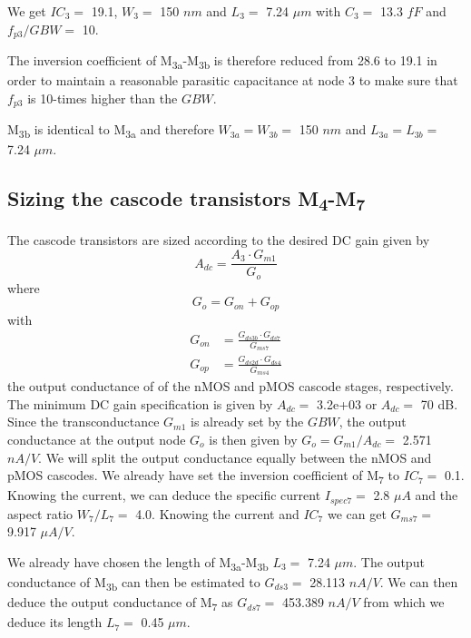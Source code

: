 \documentclass[
  a4paper,
  DIV=11,
  numbers=noendperiod]{scrreprt}
\begin{document}
We get \(IC_3 =\) 19.1, \(W_3 =\) 150 \(nm\) and \(L_3 =\) 7.24
\(\mu m\) with \(C_3 =\) 13.3 \(fF\) and \(f_{p3}/GBW =\) 10.

The inversion coefficient of M\textsubscript{3a}-M\textsubscript{3b} is
therefore reduced from 28.6 to 19.1 in order to maintain a reasonable
parasitic capacitance at node 3 to make sure that \(f_{p3}\) is 10-times
higher than the \(GBW\).

M\textsubscript{3b} is identical to M\textsubscript{3a} and therefore
\(W_{3a} = W_{3b} =\) 150 \(nm\) and \(L_{3a} = L_{3b} =\) 7.24
\(\mu m\).

\subsection{\texorpdfstring{Sizing the cascode transistors
M\textsubscript{4}-M\textsubscript{7}}{Sizing the cascode transistors M4-M7}}\label{sizing-the-cascode-transistors-m4-m7}

The cascode transistors are sized according to the desired DC gain given
by \begin{equation}
  A_{dc} = \frac{A_3 \cdot G_{m1}}{G_o}
\end{equation} where \begin{equation}
  G_o = G_{on} + G_{op}
\end{equation} with \begin{align}
  G_{on} &= \frac{G_{ds3b} \cdot G_{ds7}}{G_{ms7}}\\
  G_{op} &= \frac{G_{ds2d} \cdot G_{ds4}}{G_{ms4}}
\end{align} the output conductance of of the nMOS and pMOS cascode
stages, respectively. The minimum DC gain specification is given by
\(A_{dc} =\) 3.2e+03 or \(A_{dc} =\) 70 dB. Since the transconductance
\(G_{m1}\) is already set by the \(GBW\), the output conductance at the
output node \(G_o\) is then given by \(G_o = G_{m1}/A_{dc} =\) 2.571
\(nA/V\). We will split the output conductance equally between the nMOS
and pMOS cascodes. We already have set the inversion coefficient of
M\textsubscript{7} to \(IC_7 =\) 0.1. Knowing the current, we can deduce
the specific current \(I_{spec7} =\) 2.8 \(\mu A\) and the aspect ratio
\(W_7/L_7 =\) 4.0. Knowing the current and \(IC_7\) we can get
\(G_{ms7} =\) 9.917 \(\mu A/V\).

We already have chosen the length of
M\textsubscript{3a}-M\textsubscript{3b} \(L_3 =\) 7.24 \(\mu m\). The
output conductance of M\textsubscript{3b} can then be estimated to
\(G_{ds3} =\) 28.113 \(nA/V\). We can then deduce the output conductance
of M\textsubscript{7} as \(G_{ds7} =\) 453.389 \(nA/V\) from which we
deduce its length \(L_7 =\) 0.45 \(\mu m\).
\end{document}
